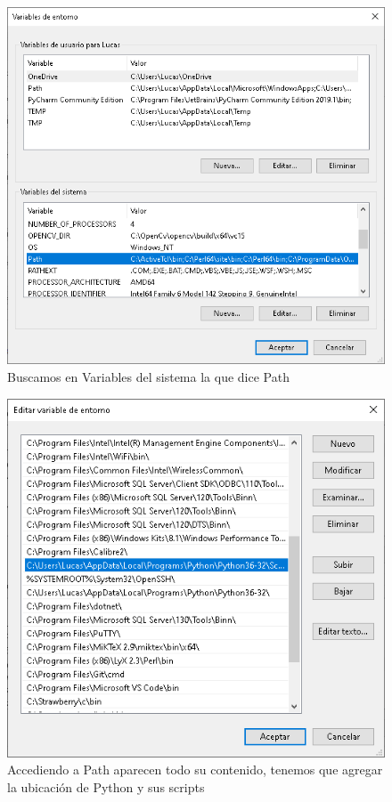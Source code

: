 \begin{figure}[H]
    \centering
    \includegraphics[scale=0.3]{imagenes/cmd/cmd_4.PNG}
    \caption{Buscamos en Variables del sistema la que dice Path}
\end{figure}

\begin{figure}[H]
    \centering
    \includegraphics[scale=0.3]{imagenes/cmd/cmd_5.PNG}
    \caption{Accediendo a Path aparecen todo su contenido, tenemos que agregar la ubicaci\'on de Python y sus scripts}
\end{figure}

